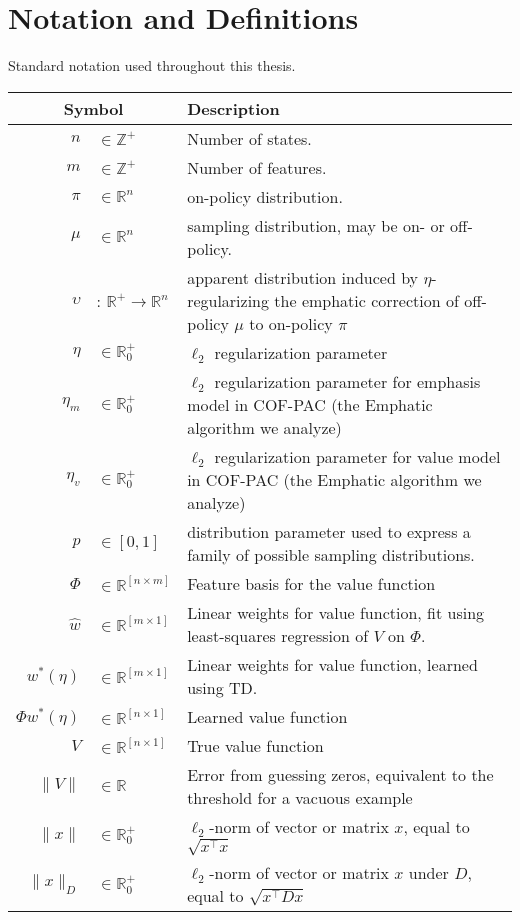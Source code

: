\chapter{Notation and Definitions}

Standard notation used throughout this thesis.

\begin{tabular}{rl p{4in}}\hline\hline
	\multicolumn{2}{c}{Symbol} & Description
	\\\hline
	$n$                        & $\in\mathbb Z^+$ & Number of states.
	\\  $m$ & $\in\mathbb Z^+$ & Number of features.
	\\  $\pi$ & $\in\mathbb R^{n}$ & on-policy distribution.
	\\  $\mu$ & $\in\mathbb R^{n}$ & sampling distribution, may be on- or off-policy.
	\\  $\upsilon$ & : $\mathbb R^+ \to \mathbb R^{n}$ & apparent distribution induced by $\eta$-regularizing the emphatic correction of off-policy $\mu$ to on-policy $\pi$
	\\  $\eta$ & $\in \mathbb R^+_0$ & $\ell_2$ regularization parameter
	\\  $\eta_m$ & $\in \mathbb R^+_0$ & $\ell_2$ regularization parameter for emphasis model in COF-PAC (the Emphatic algorithm we analyze)
	\\  $\eta_v$ & $\in \mathbb R^+_0$ & $\ell_2$ regularization parameter for value model in COF-PAC (the Emphatic algorithm we analyze)
	\\  $p$ & $\in[0, 1]$ & distribution parameter used to express a family of possible sampling distributions.
	\\  $\Phi$ & $\in \mathbb R^{[n\times m]}$ & Feature basis for the value function
	\\  $\hat w$ & $\in \mathbb R^{[m\times 1]}$ & Linear weights for value function, fit using least-squares regression of $V$ on $\Phi$.
	\\  $w^*(\eta)$ & $\in \mathbb R^{[m\times 1]}$ & Linear weights for value function, learned using TD.
	\\  $\Phi w^*(\eta)$ & $\in \mathbb R^{[n\times 1]}$ & Learned value function
	\\  $V$ & $\in \mathbb R^{[n\times 1]}$ & True value function
	\\  $\|V\|$ & $\in \mathbb R$ & Error from guessing zeros, equivalent to the threshold for a vacuous example
	\\  $\|x\|$ & $\in\mathbb R^+_0$ & $\ell_2$-norm of vector or matrix $x$, equal to $\sqrt{x^\top x}$
	\\  $\|x\|_D$ & $\in\mathbb R^+_0$ & $\ell_2$-norm of vector or matrix $x$ under $D$, equal to $\sqrt{x^\top D x}$
	\\ \hline\hline
\end{tabular}
